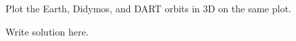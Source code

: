 

%
%

\newcommand{\hmwkTitle}{Numerical 2BP}
\newcommand{\hmwkDueDate}{February 4th, 2025}
\newcommand{\hmwkDueTime}{11:59 PM}
\newcommand{\hmwkClass}{ENAE 404 - 0101}
\newcommand{\hmwkClassTime}{09:30}
\newcommand{\hmwkClassInstructor}{Dr. Barbee}
\newcommand{\hmwkAuthorName}{\textbf{Vai Srivastava}}
\newcommand{\hmwkCompletionDate}{\today}



\maketitle

\pagebreak

\begin{hwkProblem}{1}{}

	Plot the Earth, Didymos, and DART orbits in 3D on the same plot. 

	\hwkSol

	Write solution here.

\end{hwkProblem}


